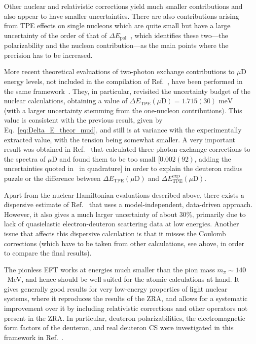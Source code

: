 \documentclass[prl,
twocolumn,
showpacs,preprintnumbers,amsmath,amssymb,
superscriptaddress,
a4paper,nofootinbib,longbibliography]{revtex4-2}
\begin{document}
Other nuclear and relativistic corrections yield much smaller contributions and also appear to have smaller uncertainties.
There are also contributions arising from TPE effects on single nucleons which are quite small but have a large uncertainty of the order of that of $\Delta E_\text{pol}$~\cite{Krauth:2015nja},
which identifies these two---the polarizability and the nucleon contribution---as the main points where the precision has to be increased.


More recent theoretical evaluations of two-photon exchange contributions to $\mu$D energy levels, not included in the compilation of Ref.~\cite{Krauth:2015nja}, have been performed
in the same framework~\cite{Hernandez:2017mof,Pachucki:2018yxe}.
They, in particular, revisited the uncertainty budget of the nuclear calculations, obtaining a value of $\Delta E_\text{TPE}(\mu\text{D})=1.715(30)\text{ meV}$~\cite{Hernandez:2017mof}
(with a larger uncertainty stemming from the one-nucleon contributions).
This value is consistent with the previous result, given by Eq.~\eqref{eq:Delta_E_theor_mud}, and still is at variance with the experimentally extracted value, with the tension being somewhat smaller.
A very important result was obtained in Ref.~\cite{Pachucki:2018yxe} that calculated three-photon exchange corrections to the spectra of $\mu$D and found them to be too small
[$0.002(92)$, adding the uncertainties quoted in~\cite{Pachucki:2018yxe} in quadrature] in order to explain
the deuteron radius puzzle or the difference between $\Delta E_\text{TPE}(\mu \text{D})$ and $\Delta E_\text{TPE}^\text{exp}(\mu\text{D})$.

Apart from the nuclear Hamiltonian evaluations described above, there exists a dispersive estimate of Ref.~\cite{Carlson:2013xea}
that uses a model-independent, data-driven approach.
However, it also gives a much larger uncertainty of about $30\%$, primarily due to lack of quasielastic electron-deuteron scattering data at low energies.
Another issue that affects this dispersive calculation is that it misses the Coulomb corrections
(which have to be taken from other calculations, see above, in order to compare the final results).

The pionless EFT works at energies much smaller than the pion mass $m_\pi\sim 140$~MeV, and hence should be well suited for the atomic calculations at hand.
It gives generally good results for very low-energy properties of light nuclear systems, where it reproduces the results of
the ZRA, and allows for a systematic improvement over it by including relativistic corrections and other operators not present in the ZRA.
In particular, deuteron polarizabilities, the electromagnetic form factors of the deuteron, and real deuteron CS were investigated
in this framework in Ref.~\cite{Chen:1999tn,Griesshammer:2000mi,Chen:2004wv,Ji:2003ia}.
\end{document}
